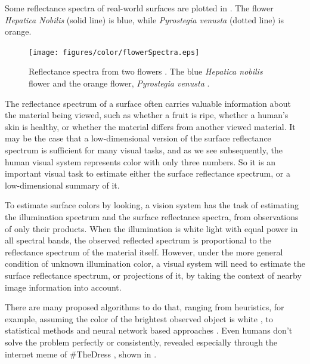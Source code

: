 Some reflectance spectra of real-world surfaces are plotted in
\fig{\ref{fig:sourcerefl}}.  The flower {\em Hepatica Nobilis} (solid line) is blue, while {\em Pyrostegia venusta} (dotted line) is orange.

\begin{figure}[t]
\centerline{
\texttt{[image: figures/color/flowerSpectra.eps]}
}
\caption{Reflectance spectra from two flowers \cite{Arnold2010}. The blue {\em Hepatica nobilis} flower \cite{nobilis} and the orange flower, {\em Pyrostegia venusta} \cite{venusta}.}
\label{fig:sourcerefl}
\end{figure}




The reflectance spectrum of a surface often carries valuable information about the material being viewed, such as whether a fruit is ripe, whether a human's skin is healthy, or whether the material differs from another viewed material.  It may be the case that a low-dimensional version of the surface reflectance spectrum is sufficient for many visual tasks, and as we see subsequently, the human visual system represents color with only three numbers.  So it is an important visual task to estimate either the surface reflectance spectrum, or a low-dimensional summary of it. 


To estimate surface colors by looking, a vision system has the task of estimating the illumination spectrum and the surface reflectance spectra, from observations of only their products.
When the illumination is white light with equal power in all spectral bands,
the observed reflected spectrum is proportional to the reflectance spectrum of the
material itself.  However, under the more general condition of unknown illumination color, a visual system will need to estimate the surface reflectance spectrum, or projections of it, by taking the context of nearby image information into account.

There are many proposed algorithms to do that, ranging from heuristics, for example, assuming the color of the brightest observed object is white \cite{McCann76}, to statistical methods \cite{Brainard97} and neural network based approaches \cite{Barron2015}.
Even humans don't solve the problem perfectly or consistently, revealed especially through the internet meme of \#TheDress \cite{Bleasdale2015}, 
shown in \fig{\ref{fig:thedress}}.  


